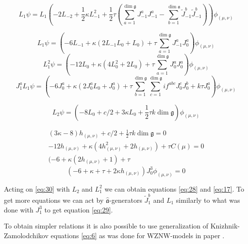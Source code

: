 \documentclass[a4paper]{article}
\theoremstyle{definition}
\newcommand{\gf}{\mathfrak{g}}
\newcommand{\af}{\mathfrak{a}}
\newcommand{\afh}{\hat{\mathfrak{a}}}
\theoremstyle{definition} \newtheorem{Def}{Definition}
\begin{document}
\begin{equation}
L_{1} \psi=L_{1}\left(-2L_{-2}+\frac{1}{2}\kappa L_{-1}^{2}+\frac{1}{2}\tau
\left(\sum_{a=1}^{\dim\gf}J^{a}_{-1}J^{a}_{-1}-\sum_{b=1}^{\dim\af}\tilde{J}^{b}_{-1}\tilde{J}^{b}_{-1}\right)\right)
\phi_{(\mu,\nu)}
\end{equation}

\begin{equation*}
L_{1}\psi = \left(-6 L_{-1}+\kappa (2  L_{-1} L_{0}+L_{0}) + \tau \sum_{a=1}^{\dim\gf}J^{a}_{-1}J^{a}_{0}\right)
\phi_{(\mu,\nu)}
\end{equation*}
\begin{equation*}
  L_{1}^{2}\psi= \left(-12 L_{0}+\kappa (4  L_{0}^{2}+2 L_{0}) + \tau \sum_{a=1}^{\dim\gf}J^{a}_{0}J^{a}_{0}\right)
\phi_{(\mu,\nu)}
\end{equation*}
\begin{equation*}
  J_{1}^{a}L_{1} \psi= \left(-6 J_{0}^{a}+\kappa (2  J_{0}^{a} L_{0}+J_{0}^{a}) + \tau
    \sum_{b=1}^{\dim\gf}\sum_{c=1}^{\dim\gf}i f^{abc}J^{c}_{0}J^{b}_{0}+k\tau J_{0}^{a}\right)
\phi_{(\mu,\nu)}
\end{equation*}


\begin{equation*}
  L_{2}\psi= \left(-8 L_{0}+c/2+ 3 \kappa L_{0}+\frac{1}{2}\tau k \dim\gf\right)
\phi_{(\mu,\nu)}
\end{equation*}

\begin{eqnarray*}
  (3\kappa-8) h_{(\mu,\nu)}+c/2+\frac{1}{2}\tau k \dim\gf=0\\
  -12 h_{(\mu,\nu)}+\kappa (4 h_{(\mu,\nu)}^{2}+2 h_{(\mu,\nu)}) +\tau C(\mu) =0\\
  (-6 +\kappa (2 h_{(\mu,\nu)}+1)+\tau
\end{eqnarray*}
\begin{equation}
  \label{eq:29} \left(-6 + \kappa + \tau + 2 \kappa h_{(\mu,\nu)}\right) J^{3}_{0}
\phi_{(\mu,\nu)}=0
\end{equation}

Acting on \eqref{eq:30} with $L_{2}$ and $L_{1}^{2}$ we can obtain equations \eqref{eq:28} and
\eqref{eq:17}. To get more equations we can act by $\afh$-generators $\tilde{J}^{b}_{1}$ and $L_{1}$
similarly to what was done with $J^{3}_{1}$ to get equation \eqref{eq:29}.

To obtain simpler relations it is also possible to use generalization of Knizhnik-Zamolodchikov
equations \eqref{eq:6} as was done for WZNW-models in paper \cite{alekseev2010sle}.
\end{document}
